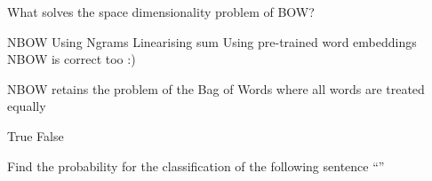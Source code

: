 \documentclass[theme=sleek, randomorder, hidesidemenu]{webquiz}
\begin{document}
\begin{question}

  What solves the space dimensionality problem of BOW?

  \begin{choice}[columns=2, multiple]
    \correct NBOW
    \incorrect Using Ngrams
    \incorrect Linearising sum
    \correct Using pre-trained word embeddings \feedback NBOW is correct too :)
  \end{choice}

\end{question}

\begin{question}

  NBOW retains the problem of the Bag of Words where all words are treated equally

  \begin{choice}[columns=2, multiple]
    \incorrect True
    \correct False
  \end{choice}

\end{question}

\begin{question}

Find the probability for the classification of the following sentence ``''
\end{question}
\end{document}
